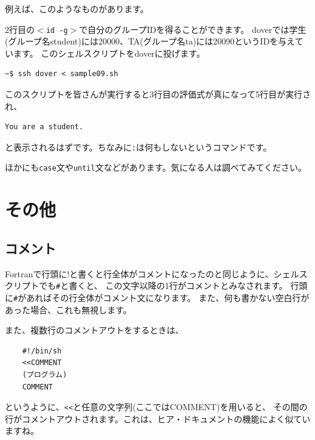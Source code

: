 \documentclass[a4j]{ltjsreport}
\begin{document}
    例えば、このようなものがあります。
    
    2行目の$<$\texttt{id -g}$>$で自分のグループIDを得ることができます。
    doverでは学生(グループ名student)には20000、TA(グループ名ta)には20090というIDを与えています。
    このシェルスクリプトをdoverに投げます。\\

    \begin{lstlisting}[numbers=none]
    ~$ ssh dover < sample09.sh
    \end{lstlisting}
    このスクリプトを皆さんが実行すると3行目の評価式が真になって5行目が実行され、
    \begin{lstlisting}[numbers=none]
    You are a student.
    \end{lstlisting}
    と表示されるはずです。ちなみに\texttt{:}は何もしないというコマンドです。

    ほかにも\texttt{case}文や\texttt{until}文などがあります。気になる人は調べてみてください。



    \section{その他}

    \subsection{コメント}
    Fortranで行頭に!と書くと行全体がコメントになったのと同じように、シェルスクリプトでも\texttt{\#}と書くと、
    この文字以降の1行がコメントとみなされます。
    行頭に\texttt{\#}があればその行全体がコメント文になります。
    また、何も書かない空白行があった場合、これも無視します。

    また、複数行のコメントアウトをするときは、
    \begin{lstlisting}
    #!/bin/sh
    <<COMMENT
    (プログラム)
    COMMENT
    \end{lstlisting}
    というように、\texttt{<<}と任意の文字列(ここではCOMMENT)を用いると、
    その間の行がコメントアウトされます。これは、ヒア・ドキュメントの機能によく似ていますね。
\end{document}
